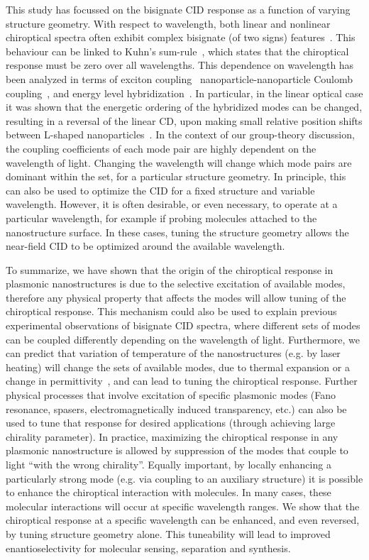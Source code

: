 This study has focussed on the bisignate CID response as a function of varying structure geometry. With respect to wavelength, both linear and nonlinear chiroptical spectra often exhibit complex bisignate (of two signs) features~\cite{Li2015, Lee2013, Decker2007, Droulias2013, Plum2009}. This behaviour can be linked to Kuhn’s sum-rule~\cite{Kuhn1930}, which states that the chiroptical response must be zero over all wavelengths. This dependence on wavelength has been analyzed in terms of exciton coupling~\cite{Guerrero-Martinez2011} nanoparticle-nanoparticle Coulomb coupling~\cite{Fan2010}, and energy level hybridization~\cite{Auguie2011a}.
In particular, in the linear optical case it was shown that the energetic ordering of the hybridized modes can be changed, resulting in a reversal of the linear CD, upon making small relative position shifts between L-shaped nanoparticles~\cite{Hentschel2015}.
In the context of our group-theory discussion, the coupling coefficients of each mode pair are highly dependent on the wavelength of light. Changing the wavelength will change which mode pairs are dominant within the set, for a particular structure geometry. In principle, this can also be used to optimize the CID for a fixed structure and variable wavelength. However, it is often desirable, or even necessary, to operate at a particular wavelength, for example if probing molecules attached to the nanostructure surface. In these cases, tuning the structure geometry allows the near-field CID to be optimized around the available wavelength.

To summarize, we have shown that the origin of the chiroptical response in plasmonic nanostructures is due to the selective excitation of available modes, therefore any physical property that affects the modes will allow tuning of the chiroptical response. This mechanism could also be used to explain previous experimental observations of bisignate CID spectra, where different sets of modes can be coupled differently depending on the wavelength of light. Furthermore, we can predict that variation of temperature of the nanostructures (e.g. by laser heating) will change the sets of available modes, due to thermal expansion or a change in permittivity~\cite{Aksyutov1977}, and can lead to tuning the chiroptical response. Further physical processes that involve excitation of specific plasmonic modes (Fano resonance, spasers, electromagnetically induced transparency, etc.) can also be used to tune that response for desired applications (through achieving large chirality parameter). 
In practice, maximizing the chiroptical response in any plasmonic nanostructure is allowed by suppression of the modes that couple to light ``with the wrong chirality''. Equally important, by locally enhancing a particularly strong mode (e.g. via coupling to an auxiliary structure) it is possible to enhance the chiroptical interaction with molecules. In many cases, these molecular interactions will occur at specific wavelength ranges. We show that the chiroptical response at a specific wavelength can be enhanced, and even reversed, by tuning structure geometry alone. This tuneability will lead to improved enantioselectivity for molecular sensing, separation and synthesis.
